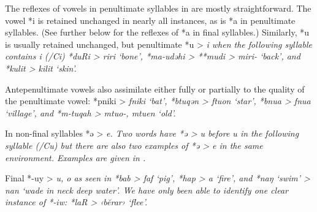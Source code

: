 The reflexes of vowels in penultimate syllables in  are mostly straightforward.
The vowel *i is retained unchanged in nearly all instances,
as is *a in penultimate syllables.
(See further below for the reflexes of *a in final syllables.)
Similarly, *u is usually retained unchanged,
but penultimate *u > \it{i} when the following syllable contains
\it{i} (/{\gap}Ci) *duRi > \it{riri} ‘bone’,
*ma-udəhi > **mudi > \it{miri-} ‘back’,
and *kulit > \it{kilit} ‘skin’.

Antepenultimate vowels also assimilate either fully or partially
to the quality of the penultimate vowel: *pniki > \it{fniki}
‘bat’, *btuqən > \it{ftuon} ‘star’,
*bnua > \it{fnua} ‘village’,
and *m-tuqah > \it{mtuo-, mtuen} ‘old’.

In non-final syllables *ə > \it{e}.
Two words have *ə > \it{u} before \it{u} in the following syllable
(/{\gap}Cu) but there are also two examples of *ə > \it{e} in the same environment.
 Examples are given in .


Final *-uy > \it{u, o} as seen in *bab > \it{faf} ‘pig’,
*hap > \it{a} ‘fire’,
and *naŋ ‘swim’ > \it{nan} ‘wade in neck deep water’.
We have only been able to identify one clear instance of *-iw:
*laR > ‹bĕ\it{ra}r› ‘flee’.

